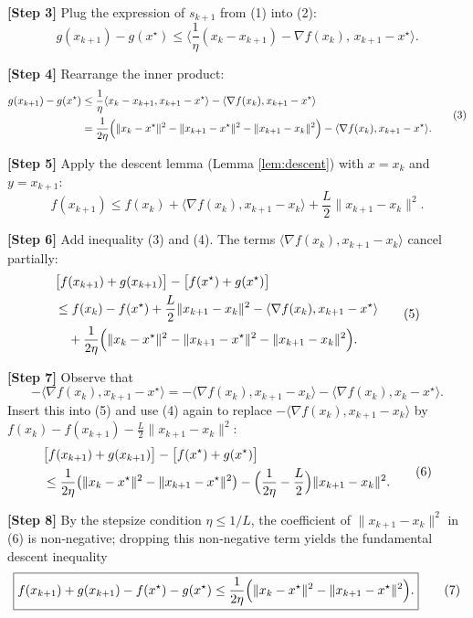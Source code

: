 \documentclass{article}
\begin{document}
\noindent\textbf{[Step 3]} Plug the expression of $s_{k+1}$ from (1) into (2):
\[
g(x_{k+1})-g(x^{\star})\le
\Big\langle\frac{1}{\eta}(x_{k}-x_{k+1})-\nabla f(x_{k}),\,x_{k+1}-x^{\star}\Big\rangle .
\]

\noindent\textbf{[Step 4]} Rearrange the inner product:
\[
\begin{aligned}
g(x_{k+1})-g(x^{\star})
&\le\frac{1}{\eta}\langle x_{k}-x_{k+1},x_{k+1}-x^{\star}\rangle
-\langle\nabla f(x_{k}),x_{k+1}-x^{\star}\rangle\\
&=\frac{1}{2\eta}\Bigl(\|x_{k}-x^{\star}\|^{2}-\|x_{k+1}-x^{\star}\|^{2}
-\|x_{k+1}-x_{k}\|^{2}\Bigr)
-\langle\nabla f(x_{k}),x_{k+1}-x^{\star}\rangle .
\end{aligned}
\tag{3}
\]

\noindent\textbf{[Step 5]} Apply the descent lemma (Lemma \ref{lem:descent}) with $x=x_{k}$ and $y=x_{k+1}$:
\[
f(x_{k+1})\le f(x_{k})+\langle\nabla f(x_{k}),x_{k+1}-x_{k}\rangle+\frac{L}{2}\|x_{k+1}-x_{k}\|^{2}.
\tag{4}
\]

\noindent\textbf{[Step 6]} Add inequality (3) and (4). The terms $\langle\nabla f(x_{k}),x_{k+1}-x_{k}\rangle$ cancel partially:
\[
\begin{aligned}
&\bigl[f(x_{k+1})+g(x_{k+1})\bigr]-\bigl[f(x^{\star})+g(x^{\star})\bigr] \\
&\le f(x_{k})-f(x^{\star})+\frac{L}{2}\|x_{k+1}-x_{k}\|^{2}
-\langle\nabla f(x_{k}),x_{k+1}-x^{\star}\rangle\\
&\quad+\frac{1}{2\eta}\Bigl(\|x_{k}-x^{\star}\|^{2}-\|x_{k+1}-x^{\star}\|^{2}
-\|x_{k+1}-x_{k}\|^{2}\Bigr).
\end{aligned}
\tag{5}
\]

\noindent\textbf{[Step 7]} Observe that 
\[
-\langle\nabla f(x_{k}),x_{k+1}-x^{\star}\rangle
= -\langle\nabla f(x_{k}),x_{k+1}-x_{k}\rangle-\langle\nabla f(x_{k}),x_{k}-x^{\star}\rangle .
\]
Insert this into (5) and use (4) again to replace $-\langle\nabla f(x_{k}),x_{k+1}-x_{k}\rangle$ by 
$f(x_{k})-f(x_{k+1})-\frac{L}{2}\|x_{k+1}-x_{k}\|^{2}$:
\[
\begin{aligned}
&\bigl[f(x_{k+1})+g(x_{k+1})\bigr]-\bigl[f(x^{\star})+g(x^{\star})\bigr] \\
&\le \frac{1}{2\eta}\bigl(\|x_{k}-x^{\star}\|^{2}-\|x_{k+1}-x^{\star}\|^{2}\bigr)
-\Bigl(\frac{1}{2\eta}-\frac{L}{2}\Bigr)\|x_{k+1}-x_{k}\|^{2}.
\end{aligned}
\tag{6}
\]

\noindent\textbf{[Step 8]} By the stepsize condition $\eta\le 1/L$, the coefficient of $\|x_{k+1}-x_{k}\|^{2}$ in (6) is non‑negative; dropping this non‑negative term yields the fundamental descent inequality
\[
\boxed{
f(x_{k+1})+g(x_{k+1})-f(x^{\star})-g(x^{\star})
\le \frac{1}{2\eta}\Bigl(\|x_{k}-x^{\star}\|^{2}-\|x_{k+1}-x^{\star}\|^{2}\Bigr).
}
\tag{7}
\]
\end{document}
